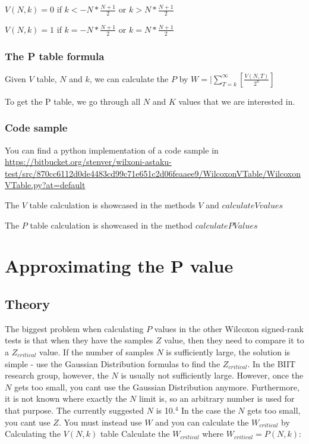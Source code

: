 \documentclass[12pt]{article}
\begin{document}
$V(N, k) = 0$ if $k < -N * \frac{N+1}{2}$ or $k > N * \frac{N+1}{2}$

$V(N, k) = 1$ if $k = -N * \frac{N+1}{2}$ or $k = N * \frac{N+1}{2}$

\subsubsection{The P table formula}
Given $V$ table, $N$ and $k$, we can calculate the $P$ by
$W=|\sum\limits_{T = k}^{\infty}[\frac{V(N, T)}{2^n}]$

To get the P table, we go through all $N$ and $K$ values that we are interested in.

\subsubsection{Code sample}
You can find a python implementation of a code sample in
\url{https://bitbucket.org/stenver/wilxoni-astaku-test/src/870cc6112d0de4483cd99c71e651c2d06feaaee9/WilcoxonVTable/WilcoxonVTable.py?at=default}

The $V$ table calculation is showcased in the methods $V$ and $calculateVvalues$

The $P$ table calculation is showcased in the method $calculatePValues$

\newpage

\section{Approximating the P value}

\subsection{Theory}
The biggest problem when calculating $P$ values in the other Wilcoxon signed-rank tests is that when they have the samples $Z$ value, then they need to compare it to a $Z_{critical}$ value. If the number of samples $N$ is sufficiently large, the solution is simple - use the Gaussian Distribution formulas to find the $Z_{critical}$. In the BIIT research group, however, the $N$ is usually not sufficiently large.
However, once the $N$ gets too small, you cant use the Gaussian Distribution anymore. Furthermore, it is not known where exactly the $N$ limit is, so an arbitrary number is used for that purpose. The currently suggested $N$ is 10.$^4$
In the case the $N$ gets too small, you cant use $Z$. You must instead use $W$ and you can calculate the $W_{critical}$ by
Calculating the $V(N, k)$ table
Calculate the $W_{critical}$ where $W_{critical} = P(N, k)$:
\end{document}
